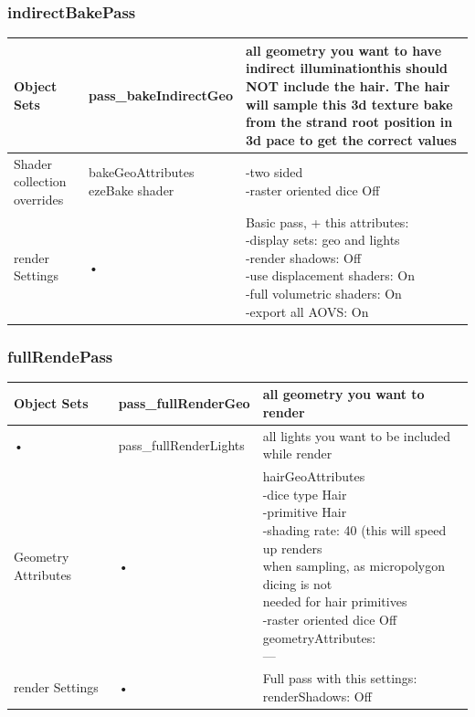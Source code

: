 \documentclass[final,letterpaper,twoside,12pt]{report}
\begin{document}
\subsubsection {indirectBakePass}
\footnotesize
\begin{tabular}{|l|l|l|}
\hline 
Object Sets & pass\_bakeIndirectGeo & \parbox[t]{5cm}{all geometry you want to have
indirect illuminationthis should NOT include the hair.  The hair will sample this 3d
texture bake from the strand root
 position in 3d pace to get the correct values}\\
\hline
Shader collection overrides & \parbox[t]{5cm}{bakeGeoAttributes\\
ezeBake shader}
 & \parbox[t]{5cm}{-two sided\\
-raster oriented dice Off}\\
\hline 
render Settings & • & 
\parbox[t]{5cm}{Basic pass, + this attributes:\\
-display sets: geo and lights\\
-render shadows: Off\\
-use displacement shaders: On\\
-full volumetric shaders: On\\
-export all AOVS: On\\}
\\ 
\hline 
\end{tabular} 
\smallskip


\subsubsection {fullRendePass}
\footnotesize
\begin{tabular}{|l|l|l|}
\hline 
Object Sets & pass\_fullRenderGeo  & all geometry you want to render\\
\hline 
• & pass\_fullRenderLights  & all lights you want to be included while render\\
\hline
Geometry Attributes & • & \parbox[t]{7cm}{hairGeoAttributes\\
-dice type Hair\\
-primitive Hair\\
-shading rate: 40 (this will speed up renders\\
when sampling, as micropolygon dicing is not\\
needed for hair primitives\\
-raster oriented dice Off\\
geometryAttributes:\\
---}
\\
\hline 
render Settings & • & 
\parbox[t]{5cm}{Full pass with this settings:\\
renderShadows: Off}
\\ 
\hline 
\end{tabular} 
\end{document}
